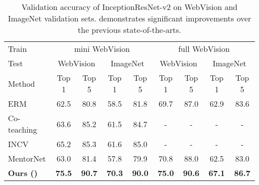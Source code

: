 \begin{table}[t]
\centering
\caption{Validation accuracy of InceptionResNet-v2 on WebVision and ImageNet validation sets. \ours{} demonstrates significant improvements over the previous state-of-the-arts.}

\label{tab:WebVision_full}
{\small
\begin{tabular}{lcccc|cccc}
\toprule
Train             & \multicolumn{4}{c|}{mini WebVision}        & \multicolumn{4}{c}{full WebVision}                \\
Test            & \multicolumn{2}{c}{WebVision}    & \multicolumn{2}{c|}{ImageNet}    & \multicolumn{2}{c}{WebVision}    & \multicolumn{2}{c}{ImageNet}  \\ 
Method & Top 1 & Top 5 & Top 1 & Top 5 & Top 1 & Top 5 & Top 1 & Top 5 \\ 
\midrule
ERM & 62.5 &80.8 & 58.5 &81.8 & 69.7 &87.0  & 62.9 &83.6 \\ 
Co-teaching & 63.6 & 85.2 & 61.5 &84.7 & - & - & - & - \\ 
INCV & 65.2 &85.3 & 61.6 &85.0 & - & - & - & - \\ 
MentorNet & 63.0 &81.4 & 57.8 &79.9 & 70.8 & 88.0 & 62.5 &83.0 \\ 
\textbf{Ours (\ours{})} & \textbf{75.5} & \textbf{90.7} & \textbf{70.3} & \textbf{90.0} & \textbf{75.0} & \textbf{90.6} & \textbf{67.1} & \textbf{86.7} \\
\bottomrule
\end{tabular}}
\end{table}



